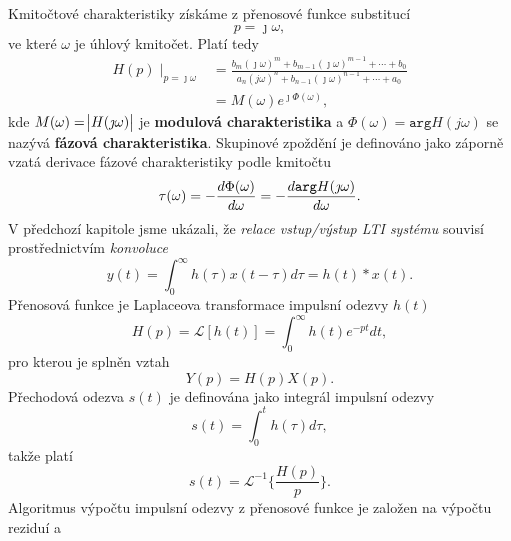       Kmitočtové charakteristiky získáme z přenosové funkce substitucí
      \begin{equation}\label{tky:eq041}
          p = \jmath\omega,
      \end{equation}
      ve které $\omega$ je úhlový kmitočet. Platí tedy
      \begin{align}
          H(p)\mid_{p = \jmath\omega} 
            &=\frac{b_m(\jmath\omega)^m+b_{m-1}(\jmath\omega)^{m-1}                     
             +\cdots+b_0}{a_n(j\omega)^n+b_{n-1}(\jmath\omega)^{n-1}+\cdots+a_0}   \nonumber \\
            &=M(\omega)e^{\jmath\Phi(\omega)},                                     \label{tky:eq003}
      \end{align}
      kde $M(\omega) = \abs{H{(\jmath\omega)}}$ je \textbf{modulová charakteristika} a
      $\Phi(\omega)=\texttt{arg}H(j\omega)$ se nazývá \textbf{fázová charakteristika}. Skupinové
      zpoždění je definováno jako záporně vzatá derivace fázové charakteristiky podle kmitočtu
      \begin{equation}\label{tky:eq042}
        \tau(\omega)=-\frac{d\Phi(\omega)}{d\omega}= -\dfrac{d \texttt{arg} H(\jmath\omega)}{d \omega}.
      \end{equation}
      V předchozí kapitole jsme ukázali, že \emph{relace vstup/výstup LTI systému} souvisí
      prostřednictvím \emph{konvoluce}
      \begin{equation}\label{tky:eq043}
          y(t)=\int_0^\infty h(\tau)x(t-\tau)d\tau = h(t)*x(t).
      \end{equation}
      Přenosová funkce je Laplaceova transformace impulsní odezvy $h(t)$
      \begin{equation}\label{tky:eq044}
          H(p)=\mathcal{L}[h(t)]=\int_0^\infty h(t)e^{-pt}dt,
      \end{equation}
      pro kterou je splněn vztah
      \begin{equation}\label{tky:eq045}
          Y(p)=H(p)X(p).
      \end{equation}
      Přechodová odezva $s(t)$ je definována jako integrál impulsní odezvy
      \begin{equation}\label{tky:eq046}
          s(t)=\int_0^th(\tau)d\tau,
      \end{equation}
      takže platí
      \begin{equation}\label{tky:eq047}
          s(t)=\mathcal{L}^{-1}\{\frac{H(p)}{p}\}.
      \end{equation}
      Algoritmus výpočtu impulsní odezvy z přenosové funkce je založen na výpočtu  reziduí a 
